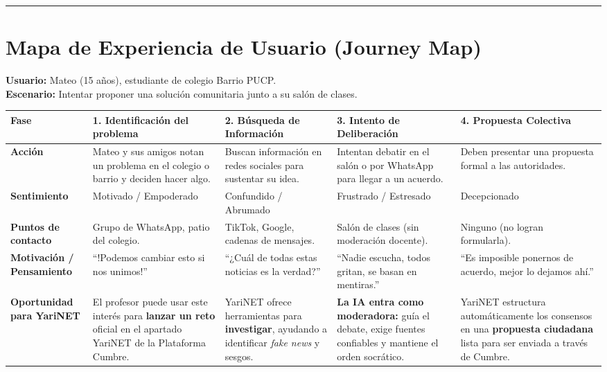 \documentclass[12pt,a4paper]{article}
\begin{document}
\vspace{0.5cm}
\hrule
\vspace{0.5cm}

\section{Mapa de Experiencia de Usuario (Journey Map)}

\textbf{Usuario:} Mateo (15 años), estudiante de colegio Barrio PUCP.\\
\textbf{Escenario:} Intentar proponer una solución comunitaria junto a su salón de clases.

\vspace{0.5cm}

\begin{tabularx}{\textwidth}{|>{\raggedright\arraybackslash}p{2.5cm}|X|X|X|X|}
\hline
\textbf{Fase} & \textbf{1. Identificación del problema} & \textbf{2. Búsqueda de Información} & \textbf{3. Intento de Deliberación} & \textbf{4. Propuesta Colectiva} \\
\hline
\textbf{Acción} & Mateo y sus amigos notan un problema en el colegio o barrio y deciden hacer algo. & Buscan información en redes sociales para sustentar su idea. & Intentan debatir en el salón o por WhatsApp para llegar a un acuerdo. & Deben presentar una propuesta formal a las autoridades. \\
\hline
\textbf{Sentimiento} & Motivado / Empoderado & Confundido / Abrumado & Frustrado / Estresado & Decepcionado \\
\hline
\textbf{Puntos de contacto} & Grupo de WhatsApp, patio del colegio. & TikTok, Google, cadenas de mensajes. & Salón de clases (sin moderación docente). & Ninguno (no logran formularla). \\
\hline
\textbf{Motivación / Pensamiento} & ``!Podemos cambiar esto si nos unimos!'' & ``¿Cuál de todas estas noticias es la verdad?'' & ``Nadie escucha, todos gritan, se basan en mentiras.'' & ``Es imposible ponernos de acuerdo, mejor lo dejamos ahí.'' \\
\hline
\hline
\textbf{Oportunidad para YariNET} & El profesor puede usar este interés para \textbf{lanzar un reto} oficial en el apartado YariNET de la Plataforma Cumbre. & YariNET ofrece herramientas para \textbf{investigar}, ayudando a identificar \textit{fake news} y sesgos. & \textbf{La IA entra como moderadora:} guía el debate, exige fuentes confiables y mantiene el orden socrático. & YariNET estructura automáticamente los consensos en una \textbf{propuesta ciudadana} lista para ser enviada a través de Cumbre. \\
\hline
\end{tabularx}
\end{document}
